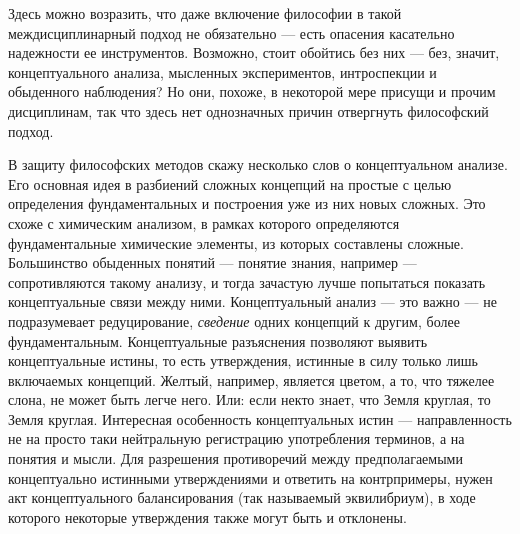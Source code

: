 \documentclass[11pt]{book}
\begin{document}
Здесь можно возразить, что даже включение философии в такой междисциплинарный подход не обязательно --- есть опасения касательно надежности ее инструментов. Возможно, стоит обойтись без них --- без, значит, концептуального анализа, мысленных экспериментов, интроспекции и обыденного наблюдения? Но они, похоже, в некоторой мере присущи и прочим дисциплинам, так что здесь нет однозначных причин отвергнуть философский подход.

В защиту философских методов скажу несколько слов о концептуальном анализе. Его основная идея в разбиений сложных концепций на простые с целью определения фундаментальных и построения уже из них новых сложных. Это схоже с химическим анализом, в рамках которого определяются фундаментальные химические элементы, из которых составлены сложные. Большинство обыденных понятий --- понятие знания, например --- сопротивляются такому анализу, и тогда зачастую лучше попытаться показать концептуальные связи между ними. Концептуальный анализ --- это важно --- не подразумевает редуцирование, \textit{сведение} одних концепций к другим, более фундаментальным. Концептуальные разъяснения позволяют выявить концептуальные истины, то есть утверждения, истинные в силу только лишь включаемых концепций. Желтый, например, является цветом, а то, что тяжелее слона, не может быть легче него. Или: если некто знает, что Земля круглая, то Земля круглая. Интересная особенность концептуальных истин --- направленность не на просто таки нейтральную регистрацию употребления терминов, а на понятия и мысли. Для разрешения противоречий между предполагаемыми концептуально истинными утверждениями и ответить на контрпримеры, нужен акт концептуального балансирования (так называемый эквилибриум), в ходе которого некоторые утверждения также могут быть и отклонены.
\end{document}
